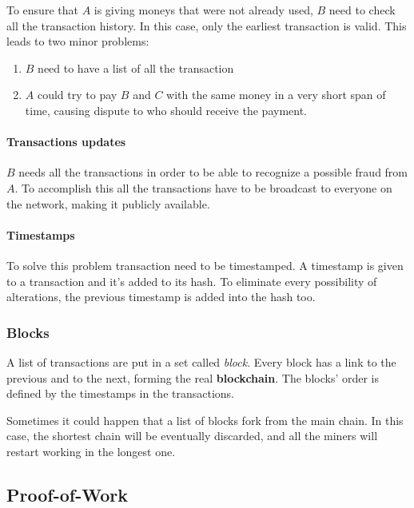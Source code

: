 To ensure that $A$ is giving moneys that were not already used, $B$ need to
check all the transaction history. In this case, only the earliest transaction
is valid\cite{nakamoto08}. This leads to two minor problems:
\begin{enumerate}
 \item $B$ need to have a list of all the transaction
 \item $A$ could try to pay $B$ and $C$ with the same money in a very short
span of time, causing dispute to who should receive the payment.
\end{enumerate}

\paragraph*{Transactions updates}
$B$ needs all the transactions in order to be able to recognize a possible
fraud from $A$. To accomplish this all the transactions have to be broadcast to
everyone on the network, making it publicly available.

\paragraph*{Timestamps}
To solve this problem transaction need to be timestamped. A timestamp is given
to a transaction and it's added to its hash. To eliminate every possibility of
alterations, the previous timestamp is added into the hash too.

\subsubsection{Blocks}
A list of transactions are put in a set called \textit{block}. Every block has
a link to the previous and to the next, forming the real \textbf{blockchain}.
The blocks' order is defined by the timestamps in the transactions.

Sometimes it could happen that a list of blocks fork from the main chain. In
this case, the shortest chain will be eventually discarded, and all the miners
will restart working in the longest one\cite{sok15}.

\subsection{Proof-of-Work}
